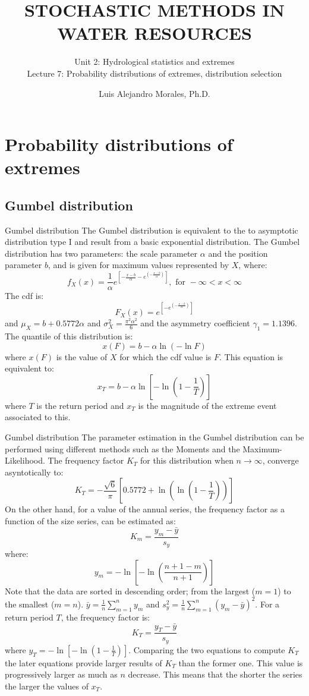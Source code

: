 \documentclass[8pt]{beamer}
\title{STOCHASTIC METHODS IN WATER RESOURCES}
\subtitle{Unit 2: Hydrological statistics and extremes \\ Lecture 7: Probability distributions of extremes, distribution selection}
\author{Luis Alejandro Morales, Ph.D.}
\institute{Universidad Nacional de Colombia \\ Department of Civil and Agriculture Engineering} %
\renewcommand{\emph}[1]{\textcolor{myorange}{#1}}
\begin{document}
\begin{frame}
    \titlepage
\end{frame}

\section{Probability distributions of extremes}
\subsection{Gumbel distribution}
\begin{frame}{Gumbel distribution}
    The \alert{Gumbel distribution} is equivalent to the to asymptotic  distribution type I and result from a basic \emph{exponential distribution}. The \emph{Gumbel distribution} has two parameters: the \emph{scale parameter} $\alpha$ and the \emph{position parameter} $b$, and is given for \emph{maximum values} represented by $X$, where:
    \[
        f_X (x) = \frac{1}{\alpha} e^{\left[ -\frac{x-b}{\alpha} -e^{\left( - \frac{x-b}{\alpha} \right) }\right]}, \text{ for } -\infty < x < \infty
    \]
    The \emph{cdf} is:
\[
    F_X (x) = e^{\left[-e^{\left( -\frac{x-b}{\alpha} \right)} \right]}
\]
and $\mu_X = b + 0.5772 \alpha$ and $\sigma_X^2 = \frac{\pi^2 \alpha^2}{6}$ and the asymmetry coefficient $\gamma_1 = 1.1396$. The \emph{quantile} of this distribution is:
\[
x(F) = b - \alpha \ln(-\ln F)
\]
where $x(F)$ is the value of $X$ for which the \emph{cdf} value is $F$. This equation is equivalent to:
\[
    x_T = b - \alpha \ln \left[ -\ln \left( 1- \frac{1}{T} \right) \right]
\]
where $T$ is the \emph{return period} and $x_T$  is the magnitude of the extreme event associated to this. 
\end{frame}

\begin{frame}{Gumbel distribution}
    The parameter estimation in the \emph{Gumbel distribution} can be performed using different methods such as the Moments and the Maximum-Likelihood. The \emph{frequency factor} $K_T$ for this distribution when $n\rightarrow \infty$, converge asyntotically to:
    \[
        K_T = - \frac{\sqrt{6}}{\pi} \left[ 0.5772 + \ln \left( \ln \left( 1-\frac{1}{T} \right) \right) \right]
    \]
    On the other hand, for a value of the annual series, the \emph{frequency factor} as a function of the size series, can be estimated as:
    \[
        K_m = \frac{y_m - \bar{y}}{s_y}
    \]
    where:
\[
    y_m  = -\ln \left[ -\ln \left( \frac{n+1-m}{n+1} \right) \right]
\]
Note that the data are sorted in descending order; from the largest ($m=1$) to the smallest ($m=n$). $\bar{y} = \frac{1}{n} \sum_{m=1}^n y_m$ and $s_y^2 = \frac{1}{n} \sum_{m=1}^n (y_m - \bar{y})^2$.
For a \emph{return period} $T$, the \emph{frequency factor} is:
\[
    K_T = \frac{y_T - \bar{y}}{s_y}
\]
where $y_T = -\ln \left[ -\ln \left( 1- \frac{1}{T} \right) \right]$. Comparing the two equations to compute $K_T$ the later equations provide larger results of $K_T$ than the former one. This value is progressively larger as much as $n$ decrease. This means that the shorter the series the larger the values of $x_T$. 
\end{frame}
\end{document}

